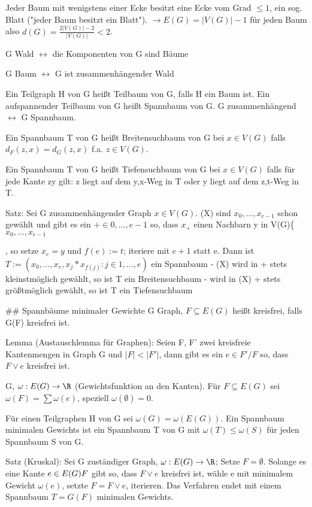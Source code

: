 \documentclass[10pt,landscape]{article}
\begin{document}
\begin{multicols}{3}
{{{Jeder Baum mit wenigstens einer Ecke besitzt eine Ecke vom Grad $\leq 1$, ein sog. Blatt ("jeder Baum besitzt ein Blatt").
$\rightarrow E(G)=|V(G)|-1$ für jeden Baum also $d(G)=\frac{2|V(G)| -2}{|V(G)|}<2$.

G Wald $\leftrightarrow$ die Komponenten von G sind Bäume

G Baum $\leftrightarrow$ G ist zusammenhängender Wald

Ein Teilgraph H von G heißt Teilbaum von G, falls H ein Baum ist. Ein aufspannender Teilbaum von G heißt Spannbaum von G. G zusammenhängend $\leftrightarrow$ G Spannbaum.

Ein Spannbaum T von G heißt Breitensuchbaum von G bei $x\in V(G)$ falls $d_F(z,x)=d_G(z,x)$ f.a. $z\in V(G)$.

Ein Spannbaum T von G heißt Tiefensuchbaum von G bei $x\in V(G)$ falls für jede Kante zy gilt: z liegt auf dem y,x-Weg in T oder y liegt auf dem z,t-Weg in T.

Satz: Sei G zusammenhängender Graph $x\in V(G)$.
(X) sind $x_0,...,x_{e-1}$ schon gewählt und gibt es ein $+ \in {0,..., e-1}$ so, dass $x_+$ einen Nachbarn y in V(G)\{$x_0,...,x_{e-1}$}, so setze $x_e=y$ und $f(e):=t$; iteriere mit $e+1$ statt e.
Dann ist $T:=({x_0,...,x_e},{x_j*x_{f(j)}: j\in {1,...,e}})$ ein Spannbaum
- (X) wird in + stets kleinstmöglich gewählt, so ist T ein Breitensuchbaum
- wird in (X) + stets größtmöglich gewählt, so ist T ein Tiefensuchbaum

## Spannbäume minimaler Gewichte
G Graph, $F \subseteq E(G)$ heißt kreisfrei, falls G(F) kreisfrei ist.

Lemma (Austauschlemma für Graphen):
Seien F, F' zwei kreisfreie Kantenmengen in Graph G und $|F|<|F'|$, dann gibt es ein $e \in F'/F$ so, dass $F\vee {e}$ kreisfrei ist.

G, $\omega:E(G)\rightarrow \R$ (Gewichtsfunktion an den Kanten). Für $F\subseteq E(G)$ sei $\omega (F)=\sum \omega (e)$, speziell $\omega (\emptyset)=0$.

Für einen Teilgraphen H von G sei $\omega (G)=\omega (E(G))$. Ein Spannbaum minimalen Gewichts ist ein Spannbaum T von G mit $\omega (T)\leq \omega (S)$ für jeden Spannbaum S von G.

Satz (Kruskal): Sei G zuständiger Graph, $\omega:E(G)\rightarrow \R$; Setze $F=\emptyset$. Solange es eine Kante $e\in E(G)\\F$ gibt so, dass $F \vee {e}$ kreisfrei ist, wähle e mit minimalem Gewicht $\omega(e)$, setzte $F=F\vee {e}$, iterieren. Das Verfahren endet mit einem Spannbaum $T=G(F)$ minimalen Gewichts.

}}
\end{multicols}
\end{document}
